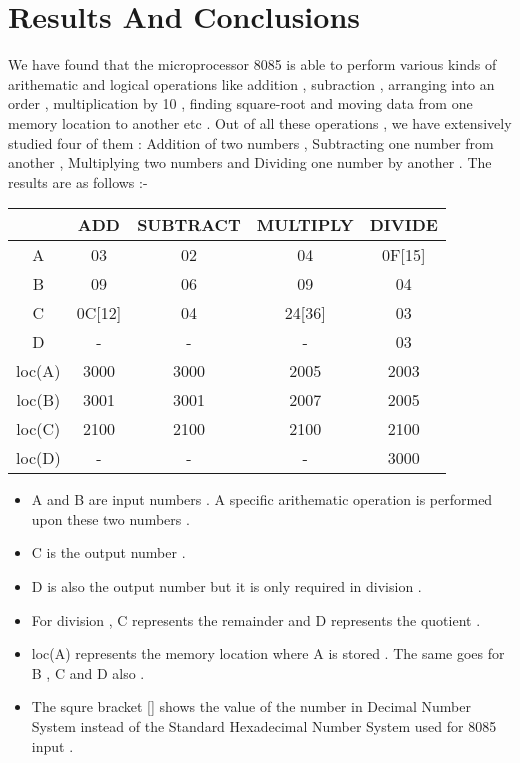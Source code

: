 \documentclass[14pt]{article}
\begin{document}
\section{Results And Conclusions}
We have found that the microprocessor 8085 is able to perform various kinds of arithematic and logical operations like addition , subraction , arranging into an order , multiplication by 10 , finding square-root and moving data from one memory location to another etc . Out of all these operations , we have extensively studied four of them : Addition of two numbers , Subtracting one number from another , Multiplying two numbers and Dividing one number by another . The results are as follows :-
\vspace{2em}
\begin{center}
\begin{tabular}{ |c|c|c|c|c| }
	\hline
	\textbf{ }& \textbf{ADD} & \textbf{SUBTRACT} & \textbf{MULTIPLY} & \textbf{DIVIDE}\\
	\hline
	A & 03 & 02 & 04 & 0F[15] \\
	\hline
	B & 09 & 06 & 09 & 04 \\
	\hline
	C & 0C[12] & 04 & 24[36] & 03 \\
	\hline
	D & - & - & - & 03 \\
	\hline
	loc(A) & 3000 & 3000 & 2005 & 2003 \\
	\hline
	loc(B) & 3001 & 3001 & 2007 & 2005 \\
	\hline
	loc(C) & 2100 & 2100 & 2100 & 2100 \\
	\hline
	loc(D) & - & - & - & 3000 \\
	\hline
\end{tabular}
\end{center}
\vspace{2em}
\begin{itemize}
	\item{A and B are input numbers . A specific arithematic operation is performed upon these two numbers .}
	\item{C is the output number .}
	\item{D is also the output number but it is only required in division .}
	\item{For division , C represents the remainder and D represents the quotient .}
	\item{loc(A) represents the memory location where A is stored . The same goes for B , C and D also .}
	\item{The squre bracket [] shows the value of the number in Decimal Number System instead of the Standard Hexadecimal Number System used for 8085 input .}
\end{itemize}
\end{document}
